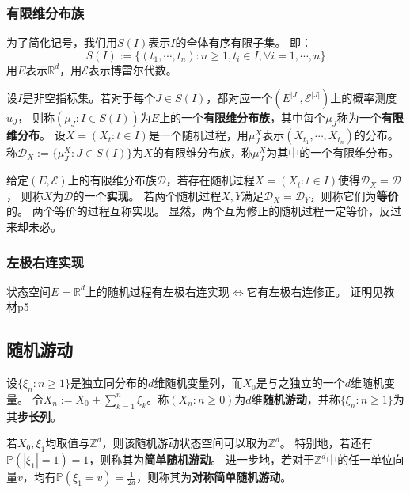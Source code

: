 \documentclass[main]{subfiles}
\begin{document}
\subsubsection{有限维分布族}
为了简化记号，我们用\(S(I)\)表示\(I\)的全体有序有限子集。
即：
\[
  S(I):=\{(t_1,\cdots,t_n):n \geq 1,t_i \in I,\forall i=1,\cdots,n\}
\]
用\(E\)表示\(\mathbb{R}^d\)，用\(\mathcal{E}\)表示博雷尔代数。
\begin{definition}\label{def:finite_distribution_class}
  设\(I\)是非空指标集。若对于每个\(J \in S(I)\)，都对应一个\((E^|J|,\mathcal{E}^|J|)\)上的概率测度\(u_J\)，
  则称\((\mu_J:I \in S(I))\)为\(E\)上的一个\textbf{有限维分布族}，其中每个\(\mu_J\)称为一个\textbf{有限维分布}。
  设\(X=(X_t:t \in I)\)是一个随机过程，用\(\mu_{J}^X\)表示\((X_{t_1},\cdots,X_{t_n})\)的分布。
  称\(\mathcal{D}_{X}:=\{\mu_J^X:J \in S(I)\}\)为\(X\)的有限维分布族，称\(\mu_J^X\)为其中的一个有限维分布。
\end{definition}
\begin{definition}\label{def:equal}
  给定\((E,\mathcal{E})\)上的有限维分布族\(\mathcal{D}\)，若存在随机过程\(X=(X_t:t \in I)\)使得\(\mathcal{D}_X=\mathcal{D}\)，
  则称\(X\)为\(\mathcal{D}\)的一个\textbf{实现}。
  若两个随机过程\(X,Y\)满足\(\mathcal{D}_X=\mathcal{D}_Y\)，则称它们为\textbf{等价}的。
  两个等价的过程互称实现。
  显然，两个互为修正的随机过程一定等价，反过来却未必。
\end{definition}
\subsubsection{左极右连实现}
\begin{definition}\label{def:zuojiyoulian}
  状态空间\(E=\mathbb{R}^d\)上的随机过程有左极右连实现\(\iff\)它有左极右连修正。
  证明见教材p5
\end{definition}
\subsection{随机游动}
\begin{definition}\label{def:svjiyzds}
  设\(\{\xi_n:n \geq 1\}\)是独立同分布的\(d\)维随机变量列，而\(X_0\)是与之独立的一个\(d\)维随机变量。
  令\(X_n:=X_0+\sum_{k=1}^{n} \xi_k\)。称\((X_n:n \geq 0)\)为\(d\)维\textbf{随机游动}，并称\(\{\xi_n:n \geq 1\}\)为其\textbf{步长列}。
\end{definition}
\begin{definition}\label{def:jmdjsvjiyzds}
  若\(X_0,\xi_1\)均取值与\(\mathbb{Z}^d\)，则该随机游动状态空间可以取为\(\mathbb{Z}^d\)。
  特别地，若还有\(\mathbb{P}(|\xi_1|=1)=1\)，则称其为\textbf{简单随机游动}。
  进一步地，若对于\(\mathbb{Z}^d\)中的任一单位向量\(v\)，均有\(\mathbb{P}(\xi_1=v)=\frac{1}{2d}\)，则称其为\textbf{对称简单随机游动}。
\end{definition}
\end{document}
